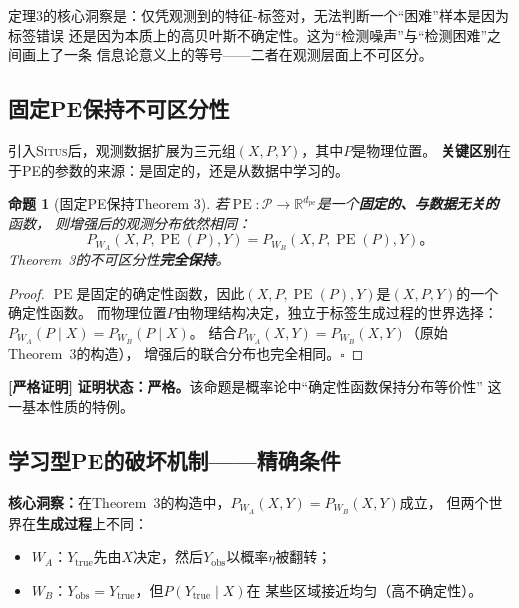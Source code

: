 \documentclass[11pt,a4paper]{article}
\newtheorem{proposition}[theorem]{命题}
\theoremstyle{remark}
\DeclareMathOperator{\PE}{PE}
\newcommand{\R}{\mathbb{R}}
\newcommand{\Ppos}{\mathcal{P}}
\newcommand{\Situs}{\textsc{Situs}}
\newcommand{\pe}{\mathrm{pe}}
\newcommand{\rigorous}{\textnormal{\textbf{[严格证明]}}}
\begin{document}
定理3的核心洞察是：仅凭观测到的特征-标签对，无法判断一个``困难''样本是因为标签错误
还是因为本质上的高贝叶斯不确定性。这为``检测噪声''与``检测困难''之间画上了一条
信息论意义上的等号——二者在观测层面上不可区分。

\subsection{固定PE保持不可区分性}

引入\Situs{}后，观测数据扩展为三元组$(X, P, Y)$，其中$P$是物理位置。
\textbf{关键区别}在于PE的参数的来源：是固定的，还是从数据中学习的。

\begin{proposition}[固定PE保持Theorem 3]
\label{prop:4.1}
若$\PE: \Ppos \to \R^{d_{\pe}}$是一个\textbf{固定的、与数据无关的}函数，
则增强后的观测分布依然相同：
\begin{equation}
    P_{W_A}(X, P, \PE(P), Y) = P_{W_B}(X, P, \PE(P), Y)。
\end{equation}
Theorem~3的不可区分性\textbf{完全保持}。
\end{proposition}

\begin{proof}
$\PE$是固定的确定性函数，因此$(X, P, \PE(P), Y)$是$(X, P, Y)$的一个确定性函数。
而物理位置$P$由物理结构决定，独立于标签生成过程的世界选择：
$P_{W_A}(P \mid X) = P_{W_B}(P \mid X)$。
结合$P_{W_A}(X, Y) = P_{W_B}(X, Y)$（原始Theorem~3的构造），
增强后的联合分布也完全相同。\hfill $\square$
\end{proof}

\rigorous{} \textbf{证明状态：严格。}该命题是概率论中``确定性函数保持分布等价性''
这一基本性质的特例。

\subsection{学习型PE的破坏机制——精确条件}

\textbf{核心洞察：}在Theorem~3的构造中，$P_{W_A}(X, Y) = P_{W_B}(X, Y)$成立，
但两个世界在\textbf{生成过程}上不同：
\begin{itemize}
    \item $W_A$：$Y_{\text{true}}$先由$X$决定，然后$Y_{\text{obs}}$以概率$\eta$被翻转；
    \item $W_B$：$Y_{\text{obs}} = Y_{\text{true}}$，但$P(Y_{\text{true}} \mid X)$在
          某些区域接近均匀（高不确定性）。
\end{itemize}
\end{document}
